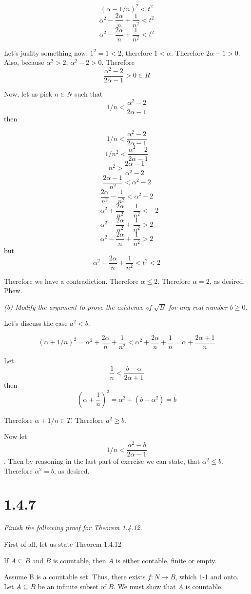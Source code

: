 \documentclass[11pt,oneside,titlepage]{article}
\begin{document}
$$(\alpha - 1/n)^2 < t^2 $$
$$\alpha^2 - \frac{2 \alpha}{n} + \frac{1}{n^2} < t^2 $$
$$\alpha^2 - \frac{2 \alpha}{n} + \frac{1}{n^2} < t^2 $$

Let's jusfity something now. $1^2 = 1 < 2$, therefore $1 < \alpha$. Therefore
$2 \alpha - 1 > 0$. Also, because $\alpha^2 > 2$, $\alpha^2 - 2 > 0$.
Therefore 
$$\frac{\alpha^2 - 2}{2 \alpha -  1} > 0 \in R$$

Now, let us pick $n \in N$ such that
$$1/n < \frac{\alpha^2 - 2}{2 \alpha -  1}$$
then

$$1/n < \frac{\alpha^2 - 2}{2 \alpha -  1}$$
$$1/n^2 < \frac{\alpha^2 - 2}{2 \alpha -  1}$$
$$n^2 > \frac{2 \alpha -  1}{\alpha^2 - 2}$$
$$\frac{2 \alpha -  1}{n^2} < \alpha^2 - 2$$
$$\frac{2 \alpha}{n^2} -  \frac{1}{n^2} < \alpha^2 - 2$$
$$- \alpha^2 + \frac{2 \alpha}{n^2} -  \frac{1}{n^2} < - 2$$
$$\alpha^2 - \frac{2 \alpha}{n^2} +  \frac{1}{n^2} > 2$$
$$\alpha^2 - \frac{2 \alpha}{n} +  \frac{1}{n^2} > 2$$
but
$$\alpha^2 - \frac{2 \alpha}{n} + \frac{1}{n^2} < t^2 < 2 $$

Therefore we have a contradiction. Therefore $\alpha \leq 2$. Therefore
$\alpha = 2$, as desired. Phew.

\textit{(b) Modify the argument to prove the existence of $\sqrt{B}$ for any
  real number $b \geq 0$.}

Let's discuss the case  $a^2 < b$.

$$(\alpha + 1/n)^2 = \alpha^2 + \frac{2 \alpha}{n} + \frac{1}{n^2} <
\alpha ^2 + \frac{2 \alpha}{n} + \frac{1}{n} = \alpha + \frac{2 \alpha + 1}{n}
$$

Let 
$$\frac{1}{n} < \frac{b - \alpha}{2 \alpha + 1}$$
then 
$$(\alpha + \frac{1}{n})^2 = \alpha^2 + (b - \alpha^2) = b$$

Therefore $\alpha + 1/n \in T$. Therefore $a^2 \geq b$.

Now let $$1/n < \frac{\alpha^2 - b}{2 \alpha -  1}$$. Then by reasoning in
the last part of exercise we can state, that $\alpha^2 \leq b$. Therefore
$\alpha^2 = b$, as desired.

\section*{1.4.7}
\textit{Finish the following proof for Theorem 1.4.12.}

First of all, let us state Theorem 1.4.12

If $A \subseteq B$ and $B$ is countable, then $A$ is either contable, finite
or empty.

Assume B is a countable set. Thus, there exists $f: N \to B$, which 1-1 and
onto. Let $A \subseteq B$ be an infinite subset of $B$. We must show that $A$
is countable.
\end{document}
